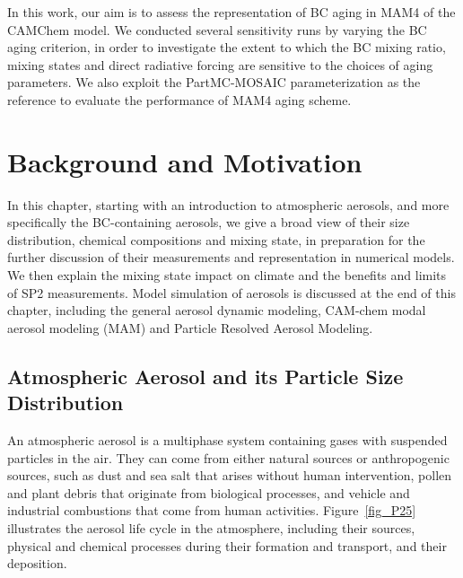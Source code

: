 \documentclass[12pt, fullpage]{uiucthesis2009}
\begin{document}
	In this work, our aim is to assess the representation of BC aging in MAM4 of the CAMChem model. We conducted several sensitivity runs by varying the BC aging criterion, in order to investigate the extent to which the BC mixing ratio, mixing states and direct radiative forcing are sensitive to the choices of aging parameters. We also exploit the PartMC-MOSAIC parameterization as the reference to evaluate the performance of MAM4 aging scheme. 
	
	\chapter{Background and Motivation}
	In this chapter, starting with an introduction to atmospheric aerosols, and more specifically the BC-containing aerosols, we give a broad view of their size distribution, chemical compositions and mixing state, in preparation for the further discussion of their measurements and representation in numerical models. We then explain the mixing state impact on climate and the benefits and limits of SP2 measurements. Model simulation of aerosols is discussed at the end of this chapter, including the general aerosol dynamic modeling, CAM-chem modal aerosol modeling (MAM) and Particle Resolved Aerosol Modeling.
	
	\section{Atmospheric Aerosol and its Particle Size Distribution}
	An atmospheric aerosol is a multiphase system containing gases with suspended particles in the air. They can come from either natural sources or anthropogenic sources, such as dust and sea salt that arises without human intervention, pollen and plant debris that originate from biological processes, and vehicle and industrial combustions that come from human activities. Figure~\ref{fig_P25} illustrates the aerosol life cycle in the atmosphere, including their sources, physical and chemical processes during their formation and transport, and their deposition. 
	
\end{document}
